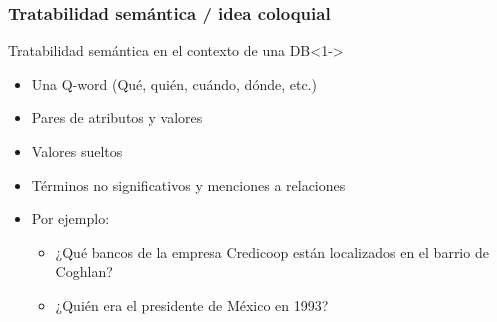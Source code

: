 \begin{frame}
  \frametitle{Tratabilidad semántica / idea coloquial}
    \begin{block}{Tratabilidad semántica en el contexto de una DB}<1->
      \begin{itemize}
          \item Una {\color{green}Q-word} (Qué, quién, cuándo, dónde, etc.)
          \item Pares de {\color{blue}atributos} y {\color{blue}valores}
          \item {\color{purple}Valores} sueltos
          \item Términos no significativos y {\color{orange}menciones a relaciones}
          \item Por ejemplo:
            \begin{itemize}
              \item ¿{\color{green}Qué} {\color{orange}bancos} de la {\color{red}empresa Credicoop} están localizados en el {\color{blue}barrio} de {\color{blue}Coghlan}?
              \item ¿{\color{green}Quién} era el {\color{red}presidente} de {\color{red}México} en {\color{purple}1993}?
            \end{itemize}
      \end{itemize}
    \end{block}
\end{frame}

